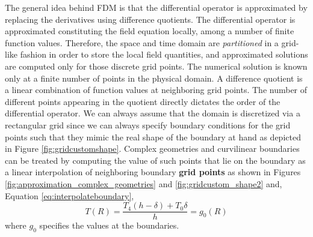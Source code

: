 The general idea behind FDM is that the differential operator is approximated by replacing the derivatives using difference quotients. The differential operator is approximated constituting the field equation locally, among a number of finite function values. Therefore, the space and time domain are \textit{partitioned} in a grid-like fashion in order to store the local field quantities, and approximated solutions are computed only for those discrete grid points. 
The numerical solution is known only at a finite number of points in the physical domain. 
A difference quotient is a linear combination of function values at neighboring grid points. The number of different points appearing in the quotient directly dictates the order of the differential operator.
We can always assume that the domain is discretized via a rectangular grid since we can always specify boundary conditions for the grid points such that they mimic the real shape of the boundary at hand as depicted in Figure \ref{fig:gridcustomshape}.
Complex geometries and curvilinear boundaries can be treated by computing the value of such points that lie on the boundary as a linear interpolation of neighboring boundary \textbf{grid points} as shown in Figures \ref{fig:approximation_complex_geometries} and \ref{fig:gridcustom_shape2} and, Equation \ref{eq:interpolateboundary},
\begin{equation}
   T(R) = \frac{T_4(h-\delta) + T_0 \delta}{h} = g_0(R)
   \label{eq:interpolateboundary}
\end{equation}
where $g_0$ specifies the values at the boundaries.

